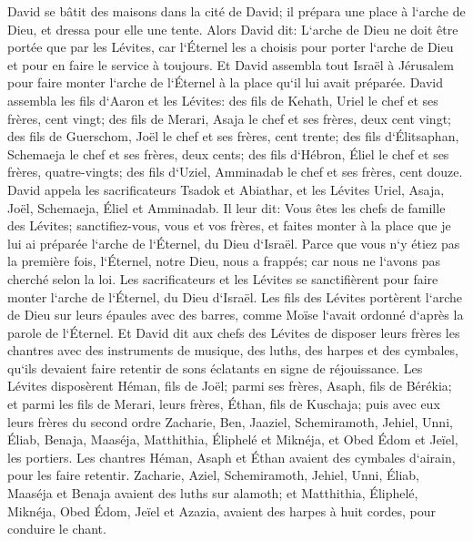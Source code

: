 \verse David se bâtit des maisons dans la cité de David; il prépara une place à l`arche de Dieu, et dressa pour elle une tente. 
\verse Alors David dit: L`arche de Dieu ne doit être portée que par les Lévites, car l`Éternel les a choisis pour porter l`arche de Dieu et pour en faire le service à toujours. 
\verse Et David assembla tout Israël à Jérusalem pour faire monter l`arche de l`Éternel à la place qu`il lui avait préparée. 
\verse David assembla les fils d`Aaron et les Lévites: 
\verse des fils de Kehath, Uriel le chef et ses frères, cent vingt; 
\verse des fils de Merari, Asaja le chef et ses frères, deux cent vingt; 
\verse des fils de Guerschom, Joël le chef et ses frères, cent trente; 
\verse des fils d`Élitsaphan, Schemaeja le chef et ses frères, deux cents; 
\verse des fils d`Hébron, Éliel le chef et ses frères, quatre-vingts; 
\verse des fils d`Uziel, Amminadab le chef et ses frères, cent douze. 
\verse David appela les sacrificateurs Tsadok et Abiathar, et les Lévites Uriel, Asaja, Joël, Schemaeja, Éliel et Amminadab. 
\verse Il leur dit: Vous êtes les chefs de famille des Lévites; sanctifiez-vous, vous et vos frères, et faites monter à la place que je lui ai préparée l`arche de l`Éternel, du Dieu d`Israël. 
\verse Parce que vous n`y étiez pas la première fois, l`Éternel, notre Dieu, nous a frappés; car nous ne l`avons pas cherché selon la loi. 
\verse Les sacrificateurs et les Lévites se sanctifièrent pour faire monter l`arche de l`Éternel, du Dieu d`Israël. 
\verse Les fils des Lévites portèrent l`arche de Dieu sur leurs épaules avec des barres, comme Moïse l`avait ordonné d`après la parole de l`Éternel. 
\verse Et David dit aux chefs des Lévites de disposer leurs frères les chantres avec des instruments de musique, des luths, des harpes et des cymbales, qu`ils devaient faire retentir de sons éclatants en signe de réjouissance. 
\verse Les Lévites disposèrent Héman, fils de Joël; parmi ses frères, Asaph, fils de Bérékia; et parmi les fils de Merari, leurs frères, Éthan, fils de Kuschaja; 
\verse puis avec eux leurs frères du second ordre Zacharie, Ben, Jaaziel, Schemiramoth, Jehiel, Unni, Éliab, Benaja, Maaséja, Matthithia, Éliphelé et Miknéja, et Obed Édom et Jeïel, les portiers. 
\verse Les chantres Héman, Asaph et Éthan avaient des cymbales d`airain, pour les faire retentir. 
\verse Zacharie, Aziel, Schemiramoth, Jehiel, Unni, Éliab, Maaséja et Benaja avaient des luths sur alamoth; 
\verse et Matthithia, Éliphelé, Miknéja, Obed Édom, Jeïel et Azazia, avaient des harpes à huit cordes, pour conduire le chant. 
